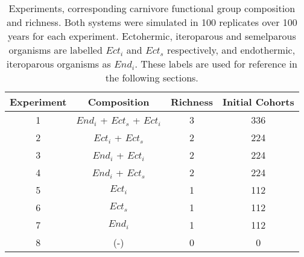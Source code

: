 \begin{table}[htb!]
\centering
\caption[Experimental design and details]{Experiments, corresponding carnivore functional group composition and richness. Both systems were simulated in 100 replicates over 100 years for each experiment. Ectohermic, iteroparous and semelparous organisms are labelled $Ect_i$ and $Ect_s$ respectively, and endothermic, iteroparous organisms as $End_i$. These labels are used for reference in the following sections.} 
\label{tab:mat:exp}
\begin{tabular*}{\textwidth}{@{\extracolsep{\fill} } cccc}
  \toprule
\textbf{Experiment} & \textbf{Composition} & \textbf{Richness} & \textbf{Initial Cohorts} \\ 
  \midrule
  1 & $End_i$ + $Ect_s$ + $Ect_i$ & 3 & 336 \\ 
   [1ex]  2 & $Ect_i$ + $Ect_s$ & 2 & 224 \\ 
    3 & $End_i$ + $Ect_i$ & 2 & 224 \\ 
    4 & $End_i$ + $Ect_s$ & 2 & 224 \\ 
   [1ex]  5 & $Ect_i$ & 1 & 112 \\ 
    6 & $Ect_s$ & 1 & 112 \\ 
    7 & $End_i$ & 1 & 112 \\ 
   [1ex]  8 & (-) & 0 & 0 \\ 
   \bottomrule
\end{tabular*}
\end{table}
